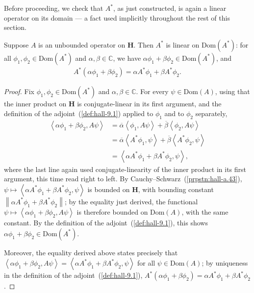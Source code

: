 Before proceeding, we check that $A^*$, as just constructed, is again a linear operator on its domain — a fact used implicitly throughout the rest of this section.

\begin{proposition}
    \label{prpstn:hall-linearity-of-the-adjoint}
    \leanok
    Suppose $A$ is an unbounded operator on $\mathbf{H}$. Then $A^*$ is linear on $\text{Dom}(A^*)$: for all $\phi_1, \phi_2 \in \text{Dom}(A^*)$ and $\alpha, \beta \in \mathbb{C}$, we have $\alpha\phi_1 + \beta\phi_2 \in \text{Dom}(A^*)$, and
    \begin{align}
        A^*(\alpha\phi_1 + \beta\phi_2) = \alpha A^*\phi_1 + \beta A^*\phi_2.
    \end{align}
\end{proposition}
\begin{proof}
    \leanok
Fix $\phi_1, \phi_2 \in \text{Dom}(A^*)$ and $\alpha, \beta \in \mathbb{C}$. For every $\psi \in \text{Dom}(A)$, using that the inner product on $\mathbf{H}$ is conjugate-linear in its first argument, and the definition of the adjoint~(\ref{def:hall-9.1}) applied to $\phi_1$ and to $\phi_2$ separately,
\begin{align}
    \left< \alpha\phi_1 + \beta\phi_2, A\psi \right> &= \overline{\alpha} \left< \phi_1, A\psi \right> + \overline{\beta} \left< \phi_2, A\psi \right> \\
                                                       &= \overline{\alpha} \left< A^*\phi_1, \psi \right> + \overline{\beta} \left< A^*\phi_2, \psi \right> \\
                                                       &= \left< \alpha A^*\phi_1 + \beta A^*\phi_2, \psi \right>,
\end{align}
where the last line again used conjugate-linearity of the inner product in its first argument, this time read right to left. By Cauchy–Schwarz~(\ref{prpstn:hall-a.43}), $\psi \mapsto \left< \alpha A^*\phi_1 + \beta A^*\phi_2, \psi \right>$ is bounded on $\mathbf{H}$, with bounding constant $\left\| \alpha A^*\phi_1 + \beta A^*\phi_2 \right\|$; by the equality just derived, the functional $\psi \mapsto \left< \alpha\phi_1 + \beta\phi_2, A\psi \right>$ is therefore bounded on $\text{Dom}(A)$, with the same constant. By the definition of the adjoint~(\ref{def:hall-9.1}), this shows $\alpha\phi_1 + \beta\phi_2 \in \text{Dom}(A^*)$.

Moreover, the equality derived above states precisely that $\left< \alpha\phi_1 + \beta\phi_2, A\psi \right> = \left< \alpha A^*\phi_1 + \beta A^*\phi_2, \psi \right>$ for all $\psi \in \text{Dom}(A)$; by uniqueness in the definition of the adjoint~(\ref{def:hall-9.1}), $A^*(\alpha\phi_1 + \beta\phi_2) = \alpha A^*\phi_1 + \beta A^*\phi_2$.
\end{proof}

